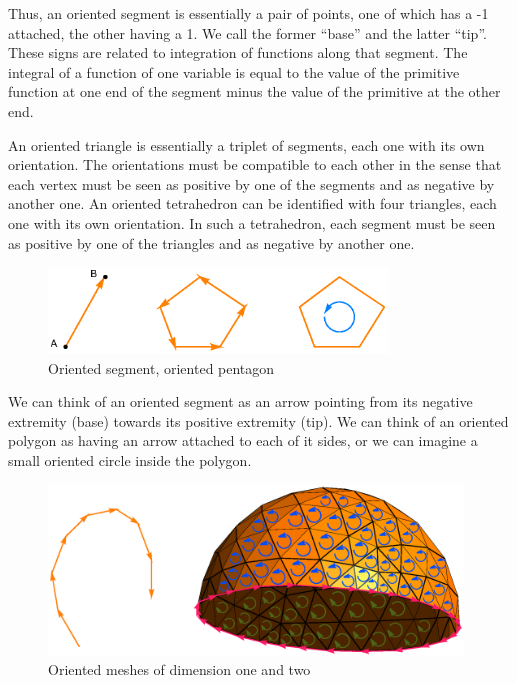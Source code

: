Thus, an oriented segment is essentially a pair of points, one of which has a \hbox{-1}
attached, the other having a 1.
We call the former ``base'' and the latter ``tip''.
These signs are related to integration of functions along that segment.
The integral of a function of one variable is equal to the value of the 
primitive function at one end of the segment minus the value of the primitive at the other end.

An oriented triangle is essentially a triplet of segments, each one with its own orientation.
The orientations must be compatible to each other in the sense that each vertex 
must be seen as positive by one of the segments and as negative by another one.
An oriented tetrahedron can be identified with four triangles, each one with its own
orientation.
In such a tetrahedron, each segment must be seen as positive by one of the triangles and
as negative by another one.

\begin{figure}[ht] \centering
  \includegraphics[width=90mm]{oriented-cells.eps}
  \caption{Oriented segment, oriented pentagon}
  \label{\numb section 1.\numb fig 2}
\end{figure}

We can think of an oriented segment as an arrow pointing from its negative extremity (base)
towards its positive extremity (tip).
We can think of an oriented polygon as having an arrow attached to each of it sides,
or we can imagine a small oriented circle inside the polygon.

\begin{figure} \centering
  \includegraphics[width=110mm]{hemisphere-7}
  \caption{Oriented meshes of dimension one and two}
  \label{\numb section 1.\numb fig 3}
\end{figure}

